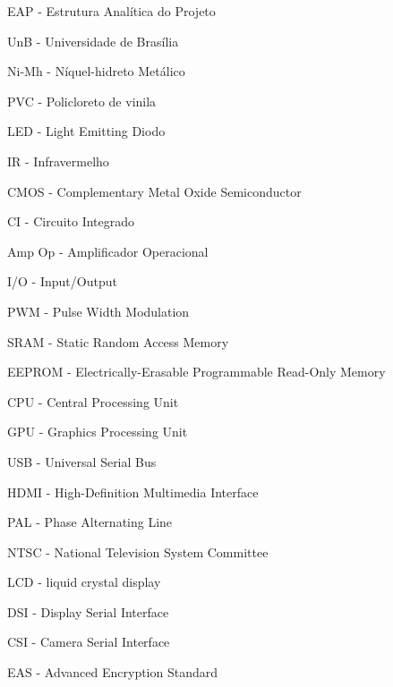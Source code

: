 \item \begin{siglas}
\item %
\item %
\item %
\item %
\item \item EAP - Estrutura Analítica do Projeto
\item UnB - Universidade de Brasília
\item Ni-Mh - Níquel-hidreto Metálico
\item PVC - Policloreto de vinila 
\item LED - Light Emitting Diodo
\item IR - Infravermelho
\item CMOS - Complementary Metal Oxide Semiconductor
\item CI - Circuito Integrado
\item Amp Op - Amplificador Operacional
\item I/O - Input/Output
\item PWM - Pulse Width Modulation
\item SRAM - Static Random Access Memory
\item EEPROM - Electrically-Erasable Programmable Read-Only Memory
\item CPU - Central Processing Unit
\item GPU - Graphics Processing Unit
\item USB - Universal Serial Bus
\item HDMI - High-Definition Multimedia Interface
\item PAL - Phase Alternating Line
\item NTSC - National Television System Committee
\item LCD - liquid crystal display
\item DSI - Display Serial Interface
\item CSI - Camera Serial Interface
\item EAS - Advanced Encryption Standard
\item \end{siglas}
